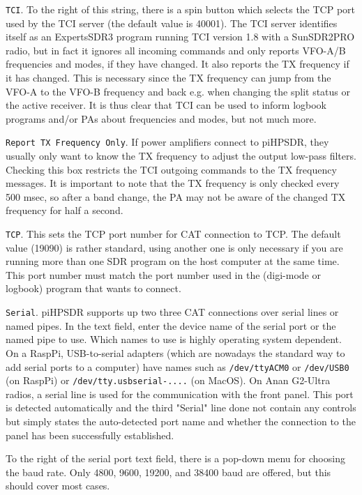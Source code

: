 \documentclass[12pt]{book}
\def\rett#1{\texttt{\color{red}#1}}
\def\pH{pi\-HPSDR\xspace}
\begin{document}
\rett{TCI}. To the right of this string, there is a spin button which selects the TCP port used by the
TCI  server (the default value is 40001). The TCI server identifies itself as an ExpertsSDR3 program
running TCI version 1.8 with a SunSDR2PRO radio, but in fact it ignores all incoming commands and only
reports VFO-A/B frequencies and modes, if they have changed. It also reports the TX frequency if it has changed.
This is necessary since the TX frequency can jump from the VFO-A to the VFO-B frequency and back e.g. when
changing the split status or the active receiver. It is thus clear that TCI can be used to
inform logbook programs and/or PAs about frequencies and modes, but not much more.

\rett{Report TX  Frequency Only}. If power amplifiers connect to \pH, they usually only want to know the
TX frequency to adjust the output low-pass filters. Checking this box restricts the TCI outgoing commands
to the TX  frequency messages. It is important  to note that the TX frequency is only  checked every
500 msec, so after a band change, the PA may  not be aware of  the changed TX frequency for half  a second.

\rett{TCP}. This sets the TCP port number for CAT connection to TCP. The default value (19090)
is rather standard, using another one is only necessary if you are running more than one
SDR program on the host computer at the same time.
This port number must match the port number used in the (digi-mode or logbook) program that wants to connect.


\rett{Serial}. \pH supports up two three CAT connections over serial lines or named pipes.
In the text field, enter the device name of the serial port or the named pipe to use.
Which names to use
is highly operating system dependent. On a RaspPi,  USB-to-serial
adapters (which are nowadays the standard way to add serial ports to a computer) have names such as
\texttt{/dev/ttyACM0} or \texttt{/dev/USB0} (on RaspPi) or \texttt{/dev/tty.usbserial-....} (on MacOS).
On Anan G2-Ultra radios, a serial line is used for the communication with the front panel. This
port is detected automatically and the third "Serial" line done not contain any controls but simply
states the auto-detected port name and whether the connection to the panel has been successfully
established.

To the right of the serial port text field, there is a pop-down menu for choosing the baud rate. Only 4800,
9600, 19200, and 38400 baud are offered, but this should cover most cases.
\end{document}
